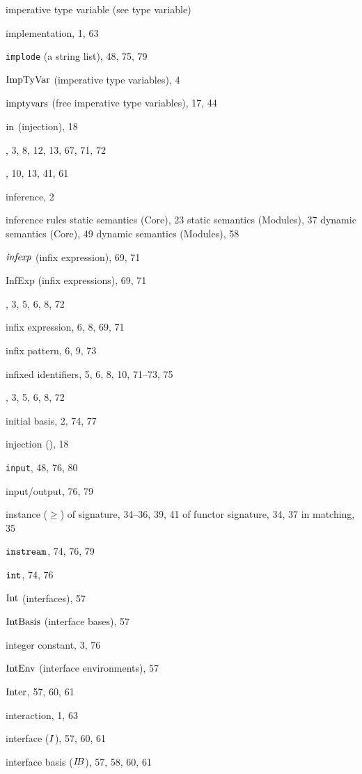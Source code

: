 \begin{theindex}
\item imperative type variable (see type variable) 
\item implementation, 1, 63
\item {\tt implode} (a string list), 48, 75, 79
\item ${\rm ImpTyVar}$ (imperative type variables), 4
\item $\mathop{\rm imptyvars}\nolimits$ (free imperative type variables), 17, 44
\item $\mbox{\rm in}$ (injection), 18
\item \IN, 3, 8, 12, 13, 67, 71, 72
\item \INCLUDE, 10, 13, 41, 61
\item inference, 2
\item inference rules 
\subitem static semantics (Core), 23
\subitem static semantics (Modules), 37
\subitem dynamic semantics (Core), 49
\subitem dynamic semantics (Modules), 58
\item ${\it infexp}$ (infix expression), 69, 71
\item InfExp (infix expressions), 69, 71
\item \INFIX, 3, 5, 6, 8, 72
\item infix expression, 6, 8, 69, 71
\item infix pattern, 6, 9, 73
\item infixed identifiers, 5, 6, 8, 10, 71--73, 75
\item \INFIXR, 3, 5, 6, 8, 72
\item initial basis, 2, 74, 77
\item injection (\In), 18
\item {\tt input}, 48, 76, 80
\item input/output, 76, 79
\item instance ($\geq$) 
\subitem of signature, 34--36, 39, 41
\subitem of functor signature, 34, 37
\subitem in matching, 35
\item $\mbox{\tt instream}$, 74, 76, 79
\item $\mbox{\tt int}$, 74, 76
\item ${\rm Int}$ (interfaces), 57
\item ${\rm IntBasis}$ (interface bases), 57
\item integer constant, 3, 76
\item ${\rm IntEnv}$ (interface environments), 57
\item $\mathop{\rm Inter}\nolimits$, 57, 60, 61
\item interaction, 1, 63
\item interface ($I$), 57, 60, 61
\item interface basis ($\mbox{$I\!B$}$), 57, 58, 60, 61

\end{theindex}
